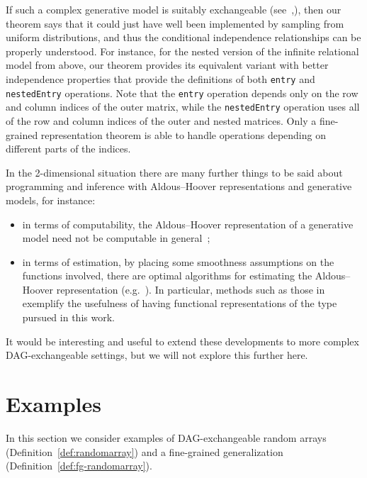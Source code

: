 \documentclass[AHL,Unicode,longabstracts,published]{cedram}
\begin{document}
If such a complex generative model is suitably exchangeable (see~\cite{statonetal2017pps},\linebreak\cite{statonetal2018icalp}), then our theorem says that it could just have well been implemented by sampling from uniform distributions, and thus the conditional independence relationships can be properly understood. For instance, for the nested version of the infinite relational model from above, our theorem provides its equivalent variant with better independence properties that provide the definitions of both \texttt{entry} and \texttt{nestedEntry} operations. Note that the \texttt{entry} operation depends only on the row and column indices of the outer matrix, while the \texttt{nestedEntry} operation uses all of the row and column indices of the outer and nested matrices. Only a fine-grained representation theorem is able to handle operations depending on different parts of the indices.

\begin{rema}
In the 2-dimensional situation there are many further things to be said about programming and inference with Aldous--Hoover representations and generative models, for instance:
\begin{itemize}
\item in terms of computability, the Aldous--Hoover representation of a generative model need not be computable in general~\cite{ackermanetal2018graphons,freer-roy2012apal};
\item in terms of estimation, by placing some smoothness assumptions on the functions involved, there are optimal algorithms for estimating the Aldous--Hoover representation (e.g.~\cite{glz-graphon}). In particular, methods such as those in~\cite{glz-graphon} exemplify the usefulness of having functional representations of the type pursued in this work.
\end{itemize}
It would be interesting and useful to extend these developments to more complex DAG-exchangeable settings, but we will not explore this further here.
\end{rema}


\section{Examples}\label{sec:setup}

In this section we consider examples of DAG-exchangeable random arrays (Definition~\ref{def:randomarray}) and a fine-grained generalization (Definition~\ref{def:fg-randomarray}).
\end{document}
